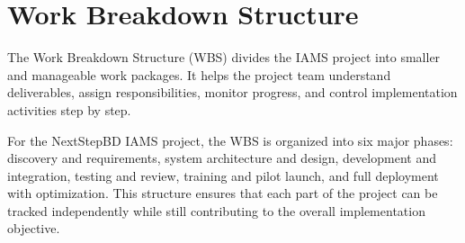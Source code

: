 \documentclass[12pt,a4paper]{report}
\begin{document}
\section{Work Breakdown Structure}

The Work Breakdown Structure (WBS) divides the IAMS project into smaller and manageable work packages. It helps the project team understand deliverables, assign responsibilities, monitor progress, and control implementation activities step by step.

For the NextStepBD IAMS project, the WBS is organized into six major phases: discovery and requirements, system architecture and design, development and integration, testing and review, training and pilot launch, and full deployment with optimization. This structure ensures that each part of the project can be tracked independently while still contributing to the overall implementation objective.
\end{document}
